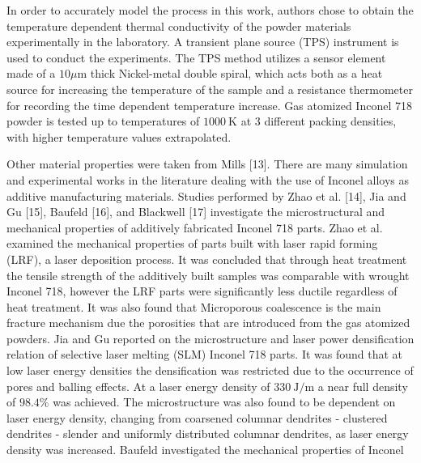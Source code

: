 \documentclass[10pt]{article}
\begin{document}
In order to accurately model the process in this work, authors chose to obtain the temperature dependent thermal conductivity of the powder materials experimentally in the laboratory. A transient plane source (TPS) instrument is used to conduct the experiments. The TPS method utilizes a sensor element made of a $10 \mu \mathrm{m}$ thick Nickel-metal double spiral, which acts both as a heat source for increasing the temperature of the sample and a resistance thermometer for recording the time dependent temperature increase. Gas atomized Inconel 718 powder is tested up to temperatures of $1000 \mathrm{~K}$ at 3 different packing densities, with higher temperature values extrapolated.

Other material properties were taken from Mills [13]. There are many simulation and experimental works in the literature dealing with the use of Inconel alloys as additive manufacturing materials. Studies performed by Zhao et al. [14], Jia and Gu [15], Baufeld [16], and Blackwell [17] investigate the microstructural and mechanical properties of additively fabricated Inconel 718 parts. Zhao et al. examined the mechanical properties of parts built with laser rapid forming (LRF), a laser deposition process. It was concluded that through heat treatment the tensile strength of the additively built samples was comparable with wrought Inconel 718, however the LRF parts were significantly less ductile regardless of heat treatment. It was also found that Microporous coalescence is the main fracture mechanism due the porosities that are introduced from the gas atomized powders. Jia and Gu reported on the microstructure and laser power densification relation of selective laser melting (SLM) Inconel 718 parts. It was found that at low laser energy densities the densification was restricted due to the occurrence of pores and balling effects. At a laser energy density of $330 \mathrm{~J} / \mathrm{m}$ a near full density of $98.4 \%$ was achieved. The microstructure was also found to be dependent on laser energy density, changing from coarsened columnar dendrites - clustered dendrites - slender and uniformly distributed columnar dendrites, as laser energy density was increased. Baufeld investigated the mechanical properties of Inconel\\
\end{document}
